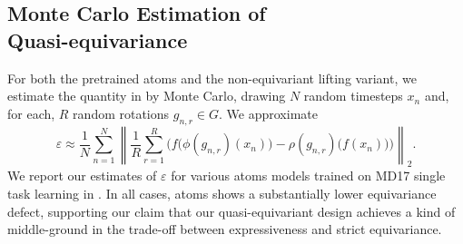 
\subsection[Monte Carlo Estimation of Quasi-equivariance]{Monte Carlo Estimation of\\ Quasi-equivariance}
\label{app:quasi_equivariance_mc}
{For both the pretrained \gls{atoms} and the non-equivariant lifting variant, we estimate the quantity in  by Monte Carlo, drawing \(N\) random timesteps \(x_n\) and, for each, \(R\) random rotations \(g_{n,r} \in G\). We approximate
\begin{equation*}
    \varepsilon \approx \frac{1}{N} \sum_{n=1}^{N} 
    \left\|
        \frac{1}{R} \sum_{r=1}^{R}
        \bigl(
            f\bigl(\phi(g_{n,r})(x_n)\bigr)
            - \rho(g_{n,r})\bigl(f(x_n)\bigr)
        \bigr)
    \right\|_2 .
\end{equation*}
We report our estimates of \(\varepsilon\) for various \gls{atoms} models trained on MD17 single task learning in . In all cases, \gls{atoms} shows a substantially lower equivariance defect, supporting our claim that our quasi-equivariant design achieves a kind of middle-ground in the trade-off between expressiveness and strict equivariance.
}

\begin{table}[H]
\centering
\caption{Estimates of Quasi-equivariance \(\varepsilon\) via Monte Carlo over 20 rotations and 10 timesteps with 2SD intervals.}
\label{tab:equivariance_defect}
\end{table}



